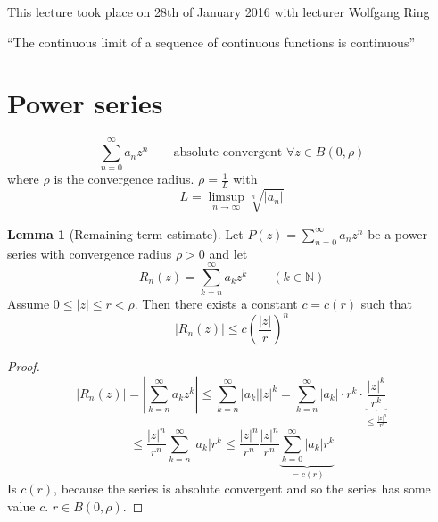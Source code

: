 \documentclass[a4paper,landscape,twocolumn]{article}
\theoremstyle{definition}
\newtheorem{lemma}{Lemma}
\newcommand\abs[1]{\left|#1\right|}
\newcommand\meta[3]{\begin{mdframed}[skipbelow=4pt,skipabove=4pt,innermargin=1pt,innerleftmargin=1pt,innerrightmargin=1pt]\begin{center}\small{\textdownarrow{} This #1 took place on #2 with lecturer #3}\end{center}\end{mdframed}}
\begin{document}
\meta{lecture}{28th of January 2016}{Wolfgang Ring}

\begin{center}
  \enquote{The continuous limit of a sequence of continuous functions is continuous}
\end{center}

\section{Power series}

\[ \sum_{n=0}^\infty a_n z^n \qquad \text{absolute convergent } \forall z \in B(0,\rho) \]
where $\rho$ is the convergence radius. $\rho = \frac1L$ with
\[ L = \limsup_{n\to\infty} \sqrt[n]{\abs{a_n}} \]

\begin{lemma}[Remaining term estimate]
  Let $P(z) = \sum_{n=0}^\infty a_n z^n$ be a power series with convergence radius
  $\rho > 0$ and let
  \[ R_n(z) = \sum_{k=n}^\infty a_k z^k \qquad (k \in \mathbb N) \]
  Assume $0 \leq \abs{z} \leq r < \rho$. Then there exists a constant $c = c(r)$
  such that
  \[ \abs{R_n(z)} \leq c \left(\frac{\abs{z}}{r}\right)^n \]
\end{lemma}
\begin{proof}
  \[
    \abs{R_n(z)}
    = \abs{\sum_{k=n}^\infty a_k z^k} \leq \sum_{k=n}^\infty \abs{a_k} \abs{z}^k
    = \sum_{k=n}^\infty \abs{a_k} \cdot r^k \cdot \underbrace{\frac{\abs{z}^k}{r^k}}_{\leq \frac{\abs{z}^n}{r^n}}
  \] \[
    \leq \frac{\abs{z}^n}{r^n} \sum_{k=n}^\infty \abs{a_k} r^k
    \leq \frac{\abs{z}^n}{r^n} \frac{\abs{z}^n}{r^n} \underbrace{\sum_{k=0}^\infty \abs{a_k} r^k}_{= c(r)}
  \]
  Is $c(r)$, because the series is absolute convergent and so the series has some value $c$.
  $r \in B(0, \rho)$.
\end{proof}
\end{document}

